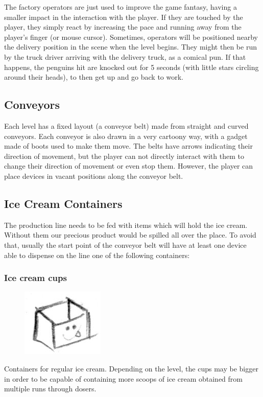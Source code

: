 \documentclass[a4paper]{scrartcl}
\begin{document}
			The factory operators are just used to improve the game fantasy, having a smaller impact in the interaction with the player. If they are touched by the player, they simply react by increasing the pace and running away from the player's finger (or mouse cursor). Sometimes, operators will be positioned nearby the delivery position in the scene when the level begins. They might then be run by the truck driver arriving with the delivery truck, as a comical pun. If that happens, the penguins hit are knocked out for 5 seconds (with little stars circling around their heads), to then get up and go back to work.

	\subsection{Conveyors}
		Each level has a fixed layout (a conveyor belt) made from straight and curved conveyors. Each conveyor is also drawn in a very cartoony way, with a gadget made of boots used to make them move. The belts have arrows indicating their direction of movement, but the player can not directly interact with them to change their direction of movement or even stop them. However, the player can place devices in vacant positions along the conveyor belt.

    \subsection{Ice Cream Containers}
        The production line needs to be fed with items which will hold the ice cream. Without them our precious product would be spilled all over the place. To avoid that, usually the start point of the conveyor belt will have at least one device able to dispense on the line one of the following containers:

        \subsubsection{Ice cream cups}
            \begin{minipage}[t][2em][t]{\textwidth}
                \begin{figure}
                    \vspace{-15pt}
                    \includegraphics[scale=1]{devices/pint}
                    \vspace{-20pt}
                \end{figure}

                Containers for regular ice cream. Depending on the level, the cups may be bigger in order to be capable of containing more scoops of ice cream obtained from multiple runs through dosers.
            \end{minipage}
\end{document}
